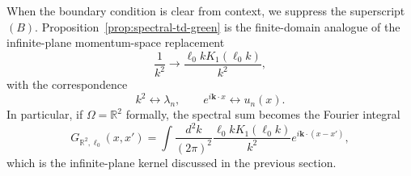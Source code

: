 \documentclass[openacc]{rsproca_new}%
\begin{document}
When the boundary condition is clear from context, we suppress the superscript $(B)$. Proposition~\ref{prop:spectral-td-green} is the finite-domain analogue of the infinite-plane momentum-space replacement
\begin{equation}
  \frac{1}{k^2}\longrightarrow\frac{\ell_0 kK_1(\ell_0 k)}{k^2},
\end{equation}
with the correspondence
\begin{equation}
  k^2\longleftrightarrow\lambda_n,
  \qquad
  e^{i\mathbf k\cdot x}\longleftrightarrow u_n(x).
\end{equation}
In particular, if $\Omega=\mathbb R^2$ formally, the spectral sum becomes the Fourier integral
\begin{equation}
  G_{\mathbb R^2,\ell_0}(x,x')
  =\int\frac{d^2k}{(2\pi)^2}
  \frac{\ell_0 kK_1(\ell_0k)}{k^2}
  e^{i\mathbf k\cdot(x-x')},
\end{equation}
which is the infinite-plane kernel discussed in the previous section.
\end{document}
